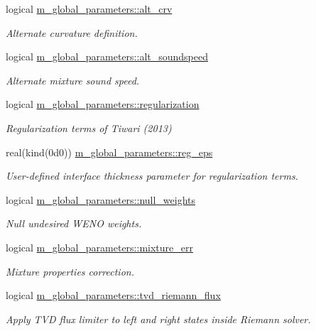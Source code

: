 \begin{DoxyCompactItemize}
logical \hyperlink{namespacem__global__parameters_a3805bb400f71c84b76e3111dd595648d}{m\+\_\+global\+\_\+parameters\+::alt\+\_\+crv}
\begin{DoxyCompactList}\small\item\em Alternate curvature definition. \end{DoxyCompactList}\item 
logical \hyperlink{namespacem__global__parameters_a5a19b6ba65c32dfc21f4762eceb25f29}{m\+\_\+global\+\_\+parameters\+::alt\+\_\+soundspeed}
\begin{DoxyCompactList}\small\item\em Alternate mixture sound speed. \end{DoxyCompactList}\item 
logical \hyperlink{namespacem__global__parameters_ac60a57ea5298dde379e24b6b77762101}{m\+\_\+global\+\_\+parameters\+::regularization}
\begin{DoxyCompactList}\small\item\em Regularization terms of Tiwari (2013) \end{DoxyCompactList}\item 
real(kind(0d0)) \hyperlink{namespacem__global__parameters_a4491f30721e61e94907cac95ff506795}{m\+\_\+global\+\_\+parameters\+::reg\+\_\+eps}
\begin{DoxyCompactList}\small\item\em User-\/defined interface thickness parameter for regularization terms. \end{DoxyCompactList}\item 
logical \hyperlink{namespacem__global__parameters_a04b52ed3df1c7aac47f18748b3cdddc5}{m\+\_\+global\+\_\+parameters\+::null\+\_\+weights}
\begin{DoxyCompactList}\small\item\em Null undesired W\+E\+NO weights. \end{DoxyCompactList}\item 
logical \hyperlink{namespacem__global__parameters_a3981c7e6886ba3cde245ce4dcc6ca664}{m\+\_\+global\+\_\+parameters\+::mixture\+\_\+err}
\begin{DoxyCompactList}\small\item\em Mixture properties correction. \end{DoxyCompactList}\item 
logical \hyperlink{namespacem__global__parameters_af2383f23c599d5936d0559dac1edee9b}{m\+\_\+global\+\_\+parameters\+::tvd\+\_\+riemann\+\_\+flux}
\begin{DoxyCompactList}\small\item\em Apply T\+VD flux limiter to left and right states inside Riemann solver. \end{DoxyCompactList}\item 

\end{DoxyCompactItemize}
